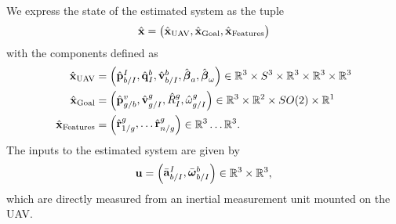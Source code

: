 
We express the state of the estimated system as the tuple
\begin{equation}
  \hat{\boldsymbol{\mathrm{x}}} =
  \begin{pmatrix}
    \hat{\boldsymbol{\mathrm{x}}}_{\text{UAV}}, \hat{\boldsymbol{\mathrm{x}}}_{\text{Goal}}, \hat{\boldsymbol{\mathrm{x}}}_{\text{Features}}
  \end{pmatrix}
\end{equation}
with the components defined as
\begin{align}
  \hat{\boldsymbol{\mathrm{x}}}_{\text{UAV}} &=
  \begin{pmatrix}
    \hat{\boldsymbol{\mathrm{p}}}_{b/I}^{I}, \hat{\boldsymbol{\mathrm{q}}}_I^{b}, \hat{\boldsymbol{\mathrm{v}}}_{b/I}^b,
    \hat{\boldsymbol{\mathrm{\beta}}}_a,
    \hat{\boldsymbol{\mathrm{\beta}}}_{\omega}
  \end{pmatrix}
    \in \mathbb{R}^3 \times S^3 \times \mathbb{R}^3 \times \mathbb{R}^3 \times
    \mathbb{R}^3  \\
    \hat{\boldsymbol{\mathrm{x}}}_{\text{Goal}} & =
    \begin{pmatrix}
      \hat{\boldsymbol{\mathrm{p}}}_{g/b}^{v}, \hat{\boldsymbol{\mathrm{v}}}_{g/I}^{g}, \hat{R}_{I}^{g},
      \hat{\omega}_{g/I}^{g}
    \end{pmatrix}
    \in \mathbb{R}^3 \times \mathbb{R}^2 \times SO(2) \times \mathbb{R}^1
    \\
    \hat{\boldsymbol{\mathrm{x}}}_{\text{Features}} & =
    \begin{pmatrix}
      \hat{\boldsymbol{\mathrm{r}}}_{1/g}^{g}, \dots \hat{\boldsymbol{\mathrm{r}}}_{n/g}^{g}
    \end{pmatrix}
    \in \mathbb{R}^3 \dots \mathbb{R}^3.
\end{align}
The inputs to the estimated system are given by
\begin{equation}
  \boldsymbol{\mathrm{u}} = \begin{pmatrix} \bar{\boldsymbol{\mathrm{a}}}_{b/I}^I, \bar{\boldsymbol{\mathrm{\omega}}}_{b/I}^b \end{pmatrix} \in
        \mathbb{R}^3 \times \mathbb{R}^3,
\end{equation}
which are directly measured from an inertial measurement unit mounted on the UAV.

